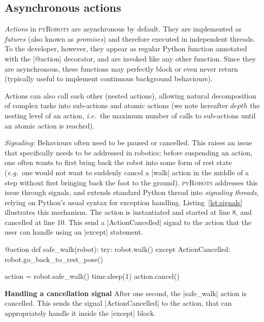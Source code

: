 \documentclass[a4paper, 10pt, conference]{ieeeconf}      %
\newcommand{\ie}{{\textit{i.e.\ }}}
\newcommand{\eg}{{\textit{e.g.\ }}}
\newcommand{\pyRobots}{\textsc{pyRobots}}
\begin{document}
\subsection{Asynchronous actions}

\emph{Actions} in \pyRobots{} are asynchronous by default. They are implemented as
\emph{futures} (also known as \emph{promises}) and therefore executed in
independent threads. To the developer, however, they appear as regular Python
function annotated with the \python|@action| decorator, and are invoked
like any other function.  Since they are asynchronous, these functions may
perfectly block or even never return (typically useful to implement continuous
background behaviours).

Actions can also call each other (nested actions), allowing natural
decomposition of complex tasks into sub-actions and atomic actions (we note
hereafter $depth$ the nesting level of an action, \ie the maximum number of
calls to sub-actions until an atomic action is reached).

\emph{Signaling:} Behaviours often need to be paused or cancelled.  This raises
an issue that specifically needs to be addressed in robotics: before suspending
an action, one often wants to first bring back the robot into some form of rest
state (\eg one would not want to suddenly cancel a \python|walk| action in the
middle of a step without first bringing back the foot to the ground). \pyRobots{}
addresses this issue through signals, and extends standard Python thread into
\emph{signaling threads}, relying on Python's usual syntax for exception
handling. Listing~\ref{lst:signals} illustrates this mechanism. The action is
instantiated and started at line 8, and cancelled at line 10. This send a
\python|ActionCancelled| signal to the action that the user can handle using an
\python|except| statement.

\begin{listing}
\begin{pythoncode}
    @action
    def safe_walk(robot):
      try:
        robot.walk()
      except ActionCancelled:
        robot.go_back_to_rest_pose()

    action = robot.safe_walk()
    time.sleep(1)
    action.cancel()
\end{pythoncode}
\caption{\textbf{Handling a cancellation signal} After one second, the
\python|safe_walk| action is cancelled. This sends the signal
\python|ActionCancelled| to the action, that can appropriately handle it inside
the \python|except| block.}
\label{lst:signals}
\end{listing}
\end{document}
